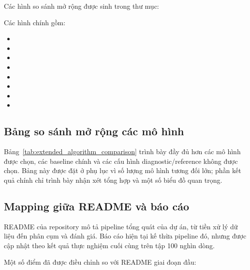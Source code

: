 Các hình so sánh mở rộng được sinh trong thư mục:

\begin{center}
\end{center}

Các hình chính gồm:

\begin{itemize}
    \item {}
    \item {}
    \item {}
    \item {}
    \item {}
    \item {}
    \item {}
    \item {}
\end{itemize}

\subsection{Bảng so sánh mở rộng các mô hình}

Bảng~\ref{tab:extended_algorithm_comparison} trình bày đầy đủ hơn các mô hình được chọn, các baseline chính và các cấu hình diagnostic/reference không được chọn. Bảng này được đặt ở phụ lục vì số lượng mô hình tương đối lớn; phần kết quả chính chỉ trình bày nhận xét tổng hợp và một số biểu đồ quan trọng.



\subsection{Mapping giữa README và báo cáo}

README của repository mô tả pipeline tổng quát của dự án, từ tiền xử lý dữ liệu đến phân cụm và đánh giá. Báo cáo hiện tại kế thừa pipeline đó, nhưng được cập nhật theo kết quả thực nghiệm cuối cùng trên tập 100 nghìn dòng.

Một số điểm đã được điều chỉnh so với README giai đoạn đầu:

